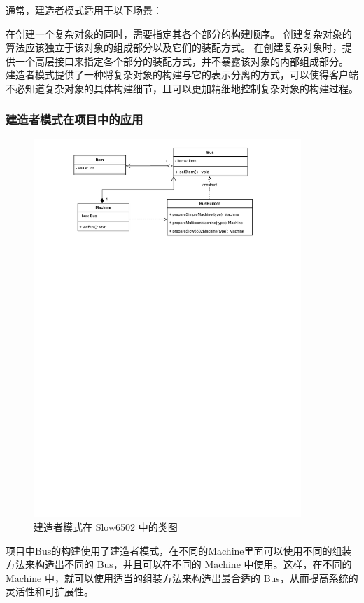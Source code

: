 \documentclass[cn,black,12pt,normal]{elegantnote}
\begin{document}
通常，建造者模式适用于以下场景：

在创建一个复杂对象的同时，需要指定其各个部分的构建顺序。
创建复杂对象的算法应该独立于该对象的组成部分以及它们的装配方式。
在创建复杂对象时，提供一个高层接口来指定各个部分的装配方式，并不暴露该对象的内部组成部分。
建造者模式提供了一种将复杂对象的构建与它的表示分离的方式，可以使得客户端不必知道复杂对象的具体构建细节，且可以更加精细地控制复杂对象的构建过程。

\subsubsection{建造者模式在项目中的应用}

\begin{figure}[H]
  \centering
  \includegraphics[width=0.9\textwidth]{figures/建造者.pdf}
  \caption{建造者模式在 Slow6502 中的类图}
\end{figure}

项目中Bus的构建使用了建造者模式，在不同的Machine里面可以使用不同的组装方法来构造出不同的 Bus，并且可以在不同的 Machine 中使用。这样，在不同的 Machine 中，就可以使用适当的组装方法来构造出最合适的 Bus，从而提高系统的灵活性和可扩展性。
\end{document}
